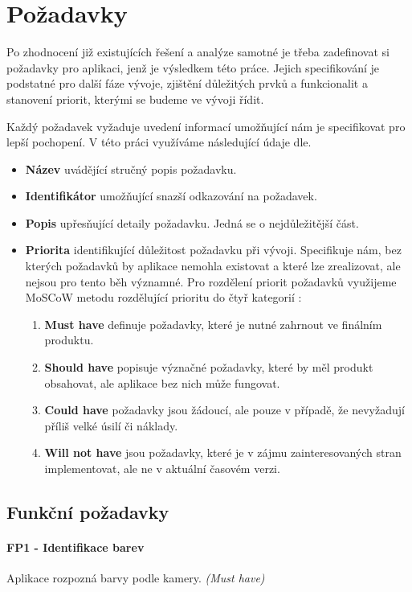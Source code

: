 \section{Požadavky}
Po zhodnocení již existujících řešení a analýze samotné je třeba zadefinovat si požadavky
pro aplikaci, jenž je výsledkem této práce. Jejich specifikování je podstatné pro další fáze vývoje,
zjištění důležitých prvků a funkcionalit a stanovení priorit, kterými se budeme ve vývoji řídit.

Každý požadavek vyžaduje uvedení informací umožňující nám je specifikovat pro lepší pochopení. V této práci
využíváme následující údaje dle. %

\begin{itemize}
  \item \textbf{Název} uvádějící stručný popis požadavku.
  \item \textbf{Identifikátor} umožňující snazší odkazování na požadavek.
  \item \textbf{Popis} upřesňující detaily požadavku. Jedná se o nejdůležitější část.
  \item \textbf{Priorita} identifikující důležitost požadavku při vývoji. Specifikuje nám, 
  bez kterých požadavků by aplikace nemohla existovat a které lze zrealizovat, ale nejsou pro tento běh významné. 
  Pro rozdělení priorit požadavků využijeme MoSCoW metodu rozdělující prioritu do čtyř kategorií \cite{moscow}:
   \begin{enumerate}
    \item \textbf{Must have} definuje požadavky, které je nutné zahrnout ve finálním produktu.
    \item \textbf{Should have} popisuje význačné požadavky, které by měl produkt obsahovat, ale aplikace bez nich může fungovat.
    \item \textbf{Could have} požadavky jsou žádoucí, ale pouze v případě, že nevyžadují příliš velké úsilí či náklady.
    \item \textbf{Will not have} jsou požadavky, které je v zájmu zainteresovaných stran implementovat, ale ne v aktuální časovém verzi.
    \end{enumerate}
\end{itemize}

\subsection{Funkční požadavky}
\paragraph{FP1 - Identifikace barev} Aplikace rozpozná barvy podle kamery. \emph{(Must have)} 

